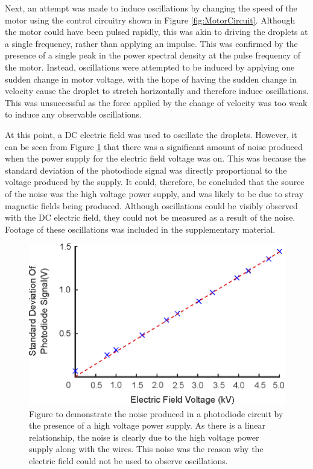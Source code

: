 \documentclass{physics_article_B}
\begin{document}
        Next, an attempt was made to induce oscillations by changing the speed of the motor using the control circuitry shown in Figure \ref{fig:MotorCircuit}. Although the motor could have been pulsed rapidly, this was akin to driving the droplets at a single frequency, rather than applying an impulse. This was confirmed by the presence of a single peak in the power spectral density at the pulse frequency of the motor. Instead, oscillations were attempted to be induced by applying one sudden change in motor voltage, with the hope of having the sudden change in velocity cause the droplet to stretch horizontally and therefore induce oscillations. This was unsuccessful as the force applied by the change of velocity was too weak to induce any observable oscillations.
        
        At this point, a DC electric field was used to oscillate the droplets. However, it can be seen from Figure \ref{fig:control} that there was a significant amount of noise produced when the power supply for the electric field voltage was on. This was because the standard deviation of the photodiode signal was directly proportional to the voltage produced by the supply. It could, therefore, be concluded that the source of the noise was the high voltage power supply, and was likely to be due to stray magnetic fields being produced. Although oscillations could be visibly observed with the DC electric field, they could not be measured as a result of the noise. Footage of these oscillations was included in the supplementary material.
        
        \begin{figure}[H]
            \centering
            \hspace*{-1.2cm}\includegraphics[scale=0.95]{Figures/ElecFieldNoise.eps}
            \caption{Figure to demonstrate the noise produced in a photodiode circuit by the presence of a high voltage power supply. As there is a linear relationship, the noise is clearly due to the high voltage power supply along with the wires. This noise was the reason why the electric field could not be used to observe oscillations.}     
            \label{fig:control}
        \end{figure} 
        
\end{document}

